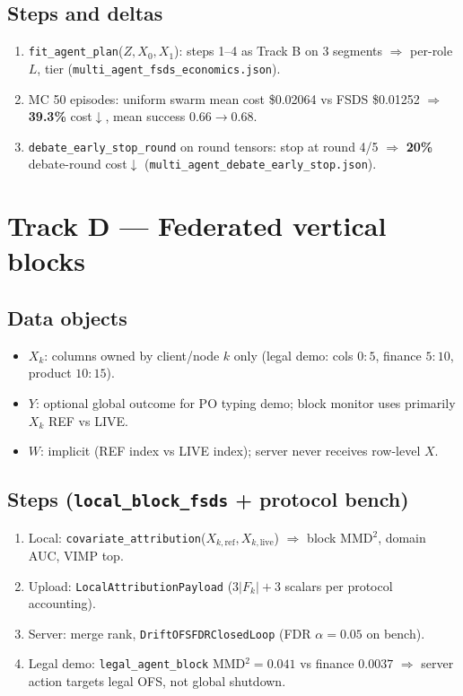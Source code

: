\documentclass[11pt]{article}
\begin{document}
\subsection{Steps and deltas}
\begin{enumerate}[nosep]
  \item \texttt{fit\_agent\_plan}($Z,X_0,X_1$): steps 1--4 as Track B on 3 segments $\Rightarrow$ per-role $L$, tier (\texttt{multi\_agent\_fsds\_economics.json}).
  \item MC 50 episodes: uniform swarm mean cost \$0.02064 vs FSDS \$0.01252 $\Rightarrow$ \textbf{39.3\%} cost$\downarrow$, mean success $0.66\rightarrow 0.68$.
  \item \texttt{debate\_early\_stop\_round} on round tensors: stop at round 4/5 $\Rightarrow$ \textbf{20\%} debate-round cost$\downarrow$ (\texttt{multi\_agent\_debate\_early\_stop.json}).
\end{enumerate}

\section{Track D --- Federated vertical blocks}

\subsection{Data objects}
\begin{itemize}[nosep]
  \item \textbf{$X_k$}: columns owned by client/node $k$ only (legal demo: cols $0{:}5$, finance $5{:}10$, product $10{:}15$).
  \item \textbf{$Y$}: optional global outcome for PO typing demo; block monitor uses primarily $X_k$ REF vs LIVE.
  \item \textbf{$W$}: implicit (REF index vs LIVE index); server never receives row-level $X$.
\end{itemize}

\subsection{Steps (\texttt{local\_block\_fsds} + protocol bench)}
\begin{enumerate}[nosep]
  \item Local: \texttt{covariate\_attribution}($X_{k,\mathrm{ref}},X_{k,\mathrm{live}}$) $\Rightarrow$ block MMD$^2$, domain AUC, VIMP top.
  \item Upload: \texttt{LocalAttributionPayload} ($3|F_k|+3$ scalars per protocol accounting).
  \item Server: merge rank, \texttt{DriftOFSFDRClosedLoop} (FDR $\alpha=0.05$ on bench).
  \item Legal demo: \texttt{legal\_agent\_block} MMD$^2=0.041$ vs finance $0.0037$ $\Rightarrow$ server action targets legal OFS, not global shutdown.
\end{enumerate}
\end{document}
